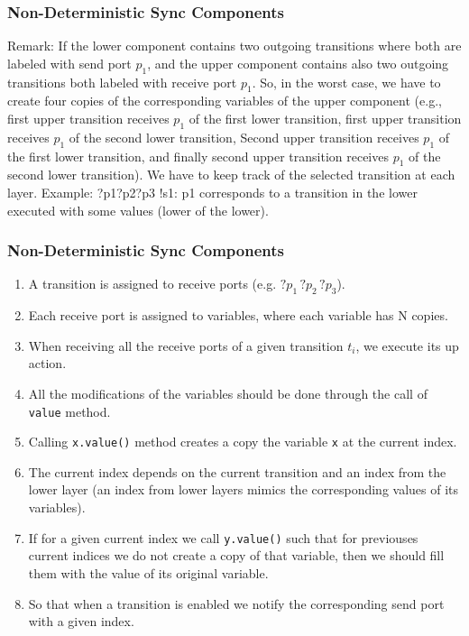 \documentclass[compress,xcolor=dvipsnames,10pt]{beamer}
\begin{document}
\begin{frame}
 \frametitle{Non-Deterministic Sync Components}
 {\scriptsize
 Remark: If the lower component contains two outgoing transitions where both are labeled with send port $p_1$, and the upper component contains also two outgoing transitions both labeled with receive port $p_1$.
 So, in the worst case, we have to create four copies of the corresponding variables of the upper component (e.g., first upper transition receives $p_1$ of the first lower transition, first upper transition receives $p_1$ of the second lower transition, 
 Second upper transition receives $p_1$ of the first lower transition, and finally second upper transition receives $p_1$ of the second lower transition). We have to keep track of the selected transition at each layer. 
 Example:
 \scriptsize ?p1?p2?p3   !s1: p1 corresponds to a transition in the lower executed with some values (lower of the lower).
 }
\end{frame}

\begin{frame}
 \frametitle{Non-Deterministic Sync Components}
 \begin{enumerate}
 \item A transition is assigned to receive ports (e.g. $?p_1 \, ?p_2 \, ?p_3$).
  \item Each receive port is assigned to variables, where each variable has N copies. 
  \item When receiving all the receive ports of a given transition $t_i$, we execute its up action. 
  \item All the modifications of the variables should be done through the call of \texttt{value} method. 
  \item Calling \texttt{x.value()} method creates a copy the variable \texttt{x} at the current index. 
  \item The current index depends on the current transition and an index from the lower layer (an index from lower layers mimics the corresponding values of its variables). 
  \item If for a given current index we call \texttt{y.value()} such that for previouses current indices we do not create a copy of that variable, then we should fill them with the value of its original variable. 
 \item So that when a transition is enabled we notify the corresponding send port with a given index. 
 \end{enumerate}

\end{frame}
\end{document}
